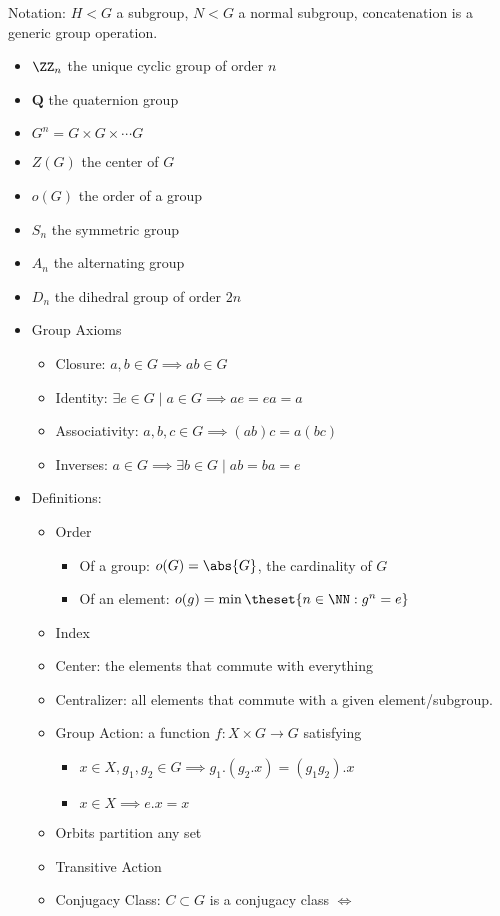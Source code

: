 Notation: \(H < G\) a subgroup, \(N < G\) a normal subgroup,
concatenation is a generic group operation.

\begin{itemize}
\item
  \(\ZZ_n\) the unique cyclic group of order \(n\)
\item
  \(\mathbf{Q}\) the quaternion group
\item
  \(G^n = G\times G \times \cdots G\)
\item
  \(Z(G)\) the center of \(G\)
\item
  \(o(G)\) the order of a group
\item
  \(S_n\) the symmetric group
\item
  \(A_n\) the alternating group
\item
  \(D_n\) the dihedral group of order \(2n\)
\item
  Group Axioms

  \begin{itemize}
  \tightlist
  \item
    Closure: \(a,b \in G \implies ab \in G\)
  \item
    Identity: \(\exists e\in G \mid a\in G \implies ae = ea = a\)
  \item
    Associativity: \(a,b,c \in G \implies (ab)c = a(bc)\)
  \item
    Inverses: \(a\in G \implies \exists b \in G \mid ab =ba = e\)
  \end{itemize}
\item
  Definitions:

  \begin{itemize}
  \tightlist
  \item
    Order

    \begin{itemize}
    \tightlist
    \item
      Of a group: \(o(G) = \abs{G}\), the cardinality of \(G\)
    \item
      Of an element: \(o(g) = \min\theset{n\in \NN : g^n = e}\)
    \end{itemize}
  \item
    Index
  \item
    Center: the elements that commute with everything
  \item
    Centralizer: all elements that commute with a given
    element/subgroup.
  \item
    Group Action: a function \(f: X\times G \to G\) satisfying

    \begin{itemize}
    \tightlist
    \item
      \(x\in X, g_1,g_2 \in G \implies g_1.(g_2.x) = (g_1g_2). x\)
    \item
      \(x\in X \implies e.x = x\)
    \end{itemize}
  \item
    Orbits partition any set
  \item
    Transitive Action
  \item
    Conjugacy Class: \(C \subset G\) is a conjugacy class \(\iff\)


\end{itemize}
\end{itemize}
